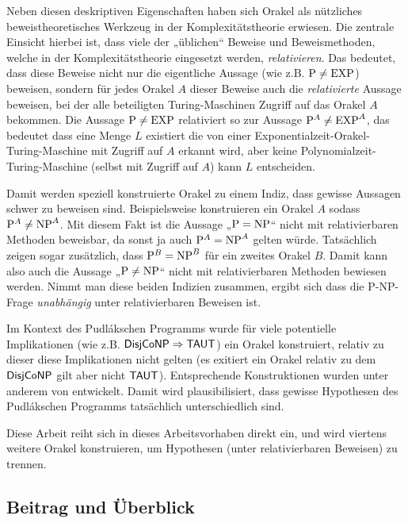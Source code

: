 Neben diesen deskriptiven Eigenschaften haben sich Orakel als nützliches beweistheoretisches Werkzeug in der Komplexitätstheorie erwiesen. Die zentrale Einsicht hierbei ist, dass viele der „üblichen“ Beweise und Beweismethoden, welche in der Komplexitätstheorie eingesetzt werden, \emph{relativieren}. Das bedeutet, dass diese Beweise nicht nur die eigentliche Aussage (wie z.B. $\P\neq \mathrm{EXP}$) beweisen, sondern für jedes Orakel $A$ dieser Beweise auch die \emph{relativierte} Aussage beweisen, bei der  alle beteiligten Turing-Maschinen Zugriff auf das Orakel $A$ bekommen. Die Aussage $\P\neq \mathrm{EXP}$ relativiert so zur Aussage $\P^A\neq \mathrm{EXP}^A$, das bedeutet dass eine Menge $L$ existiert die von einer Exponentialzeit-Orakel-Turing-Maschine mit Zugriff auf $A$ erkannt wird, aber keine Polynomialzeit-Turing-Maschine (selbst mit Zugriff auf $A$) kann $L$ entscheiden.

Damit werden speziell konstruierte Orakel zu einem Indiz, dass gewisse Aussagen schwer zu beweisen sind.
Beispielsweise konstruieren \textcite{baker_relativizations_1975} ein Orakel $A$ sodass $\P^A\neq \NP^A$. Mit diesem Fakt ist die Aussage „$\P=\NP$“ nicht mit relativierbaren Methoden beweisbar, da sonst ja auch $\P^A=\NP^A$ gelten würde. Tatsächlich zeigen \citeauthor{baker_relativizations_1975} sogar zusätzlich, dass $\P^B= \NP^B$ für ein zweites Orakel $B$. Damit kann also auch die Aussage „$\P\neq\NP$“ nicht mit relativierbaren Methoden bewiesen werden. Nimmt man diese beiden Indizien zusammen, ergibt sich dass die P-NP-Frage \emph{unabhängig} unter relativierbaren Beweisen ist.

Im Kontext des Pudlákschen Programms wurde für viele potentielle Implikationen (wie z.B. $\hDisjCoNP\Rightarrow\hTAUT$) ein Orakel konstruiert, relativ zu dieser diese Implikationen nicht gelten (es exitiert ein Orakel relativ zu dem $\hDisjCoNP$ gilt aber nicht $\hTAUT$). Entsprechende Konstruktionen wurden unter anderem von \textcites{glaser_disjoint_2004}{dose_np-completeness_2019}{dose_balance_2020}{dose_further_2020}{dingel_separation_2022}{ehrmanntraut_oracle_2022}{khaniki_new_2022} entwickelt. Damit wird plausibilisiert, dass gewisse Hypothesen des Pudlákschen Programms tatsächlich unterschiedlich sind.

Diese Arbeit reiht sich in dieses Arbeitsvorhaben direkt ein, und wird viertens weitere Orakel konstruieren, um Hypothesen (unter relativierbaren Beweisen) zu trennen.

\subsection*{Beitrag und Überblick}

